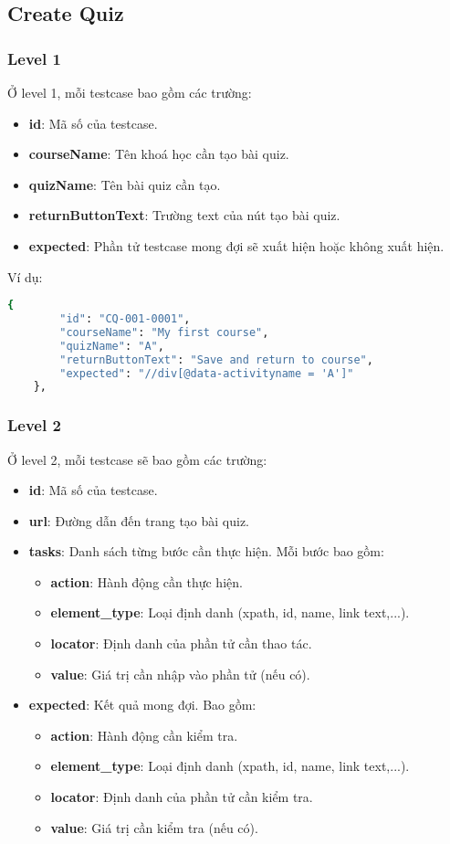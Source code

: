 \subsection{Create Quiz}
\subsubsection{Level 1}
Ở level 1, mỗi testcase bao gồm các trường:
\begin{itemize}
    \item \textbf{id}: Mã số của testcase.
    \item \textbf{courseName}: Tên khoá học cần tạo bài quiz.
    \item \textbf{quizName}: Tên bài quiz cần tạo.
    \item \textbf{returnButtonText}: Trường text của nút tạo bài quiz.
    \item \textbf{expected}: Phần tử testcase mong đợi sẽ xuất hiện hoặc không xuất hiện.
\end{itemize}

Ví dụ:
\begin{lstlisting}[language=bash, caption={Ví dụ testcase CQ-001-0001 ở level 1}]
    {
        "id": "CQ-001-0001",
        "courseName": "My first course",
        "quizName": "A",
        "returnButtonText": "Save and return to course",
        "expected": "//div[@data-activityname = 'A']"
    },
\end{lstlisting}
\subsubsection{Level 2}

Ở level 2, mỗi testcase sẽ bao gồm các trường:
\begin{itemize}
    \item \textbf{id}: Mã số của testcase.
    \item \textbf{url}: Đường dẫn đến trang tạo bài quiz.
    \item \textbf{tasks}: Danh sách từng bước cần thực hiện. Mỗi bước bao gồm:
\begin{itemize}
    \item \textbf{action}: Hành động cần thực hiện.
    \item \textbf{element\_type}: Loại định danh (xpath, id, name, link text,...).
    \item \textbf{locator}: Định danh của phần tử cần thao tác.
    \item \textbf{value}: Giá trị cần nhập vào phần tử (nếu có).
\end{itemize}
    \item \textbf{expected}: Kết quả mong đợi. Bao gồm:
\begin{itemize}
    \item \textbf{action}: Hành động cần kiểm tra.
    \item \textbf{element\_type}: Loại định danh (xpath, id, name, link text,...).
    \item \textbf{locator}: Định danh của phần tử cần kiểm tra.
    \item \textbf{value}: Giá trị cần kiểm tra (nếu có).
\end{itemize}
\end{itemize}

